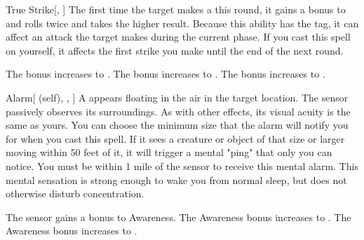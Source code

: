 \lowercase{\hypertarget{spell:True Strike}{}}\label{spell:True Strike}
\begin{freeability}[Rank 1]{\hypertarget{spell:True Strike}{True Strike}}[, ]
The first time the target makes a  this round,
it gains a  bonus to  and rolls twice and takes the higher result.
Because this ability has the  tag, it can affect an attack the target makes during the current phase.
If you cast this spell on yourself, it affects the first strike you make until the end of the next round.

\rankline
{} The bonus increases to .
 The bonus increases to .
 The bonus increases to .
\end{freeability}
\vspace{0.25em}



\lowercase{\hypertarget{spell:Alarm}{}}\label{spell:Alarm}
\begin{attuneability}[Rank 2]{\hypertarget{spell:Alarm}{Alarm}}[ (self), , ]
A  appears floating in the air in the target location.
The sensor passively observes its surroundings.
As with other  effects, its visual acuity is the same as yours.
You can choose the minimum size that the alarm will notify you for when you cast this spell.
If it sees a creature or object of that size or larger moving within 50 feet of it, it will trigger a mental "ping" that only you can notice.
You must be within 1 mile of the sensor to receive this mental alarm.
This mental sensation is strong enough to wake you from normal sleep, but does not otherwise disturb concentration.

\rankline
{} The sensor gains a  bonus to Awareness.
 The Awareness bonus increases to .
 The Awareness bonus increases to .
\end{attuneability}
\vspace{0.25em}




